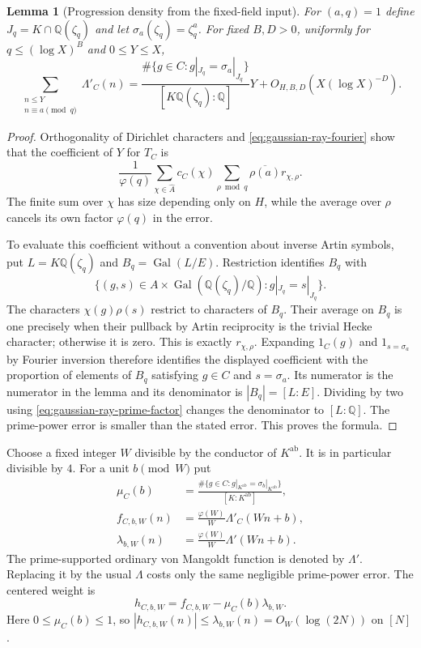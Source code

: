 \documentclass[11pt]{article}
\newtheorem{lemma}[theorem]{Lemma}
\theoremstyle{definition}
\theoremstyle{remark}
\newcommand{\Q}{\mathbb Q}
\begin{document}
\begin{lemma}[Progression density from the fixed-field input]
\label{lem:gaussian-ray-progression}
For $(a,q)=1$ define
$J_q=K\cap\Q(\zeta_q)$ and let $\sigma_a(\zeta_q)=\zeta_q^a$.
For fixed $B,D>0$, uniformly for $q\leq(\log X)^B$ and $0\leq Y\leq X$,
\[
 \sum_{\substack{n\leq Y\\ n\equiv a\pmod q}}\Lambda'_C(n)
 =\frac{\#\{g\in C:g|_{J_q}=\sigma_a|_{J_q}\}}
             {[K\Q(\zeta_q):\Q]}Y
       +O_{H,B,D}(X(\log X)^{-D}).
\]
\end{lemma}
\begin{proof}
Orthogonality of Dirichlet characters and
\eqref{eq:gaussian-ray-fourier} show that the coefficient of $Y$ for
$T_C$ is
\[
 \frac1{\varphi(q)}\sum_{\chi\in\widehat A}c_C(\chi)
       \sum_{\rho\bmod q}\overline{\rho(a)}r_{\chi,\rho}.
\]
The finite sum over $\chi$ has size depending only on $H$, while the
average over $\rho$ cancels its own factor $\varphi(q)$ in the error.

To evaluate this coefficient without a convention about inverse Artin
symbols, put $L=K\Q(\zeta_q)$ and $B_q=\operatorname{Gal}(L/E)$.
Restriction identifies $B_q$ with
\[
 \{(g,s)\in A\times\operatorname{Gal}(\Q(\zeta_q)/\Q):
                       g|_{J_q}=s|_{J_q}\}.
\]
The characters $\chi(g)\rho(s)$ restrict to characters of $B_q$.
Their average on $B_q$ is one precisely when their pullback by Artin
reciprocity is the trivial Hecke character; otherwise it is zero.
This is exactly $r_{\chi,\rho}$.  Expanding $1_C(g)$ and
$1_{s=\sigma_a}$ by Fourier inversion therefore identifies the displayed
coefficient with the proportion of elements of $B_q$ satisfying
$g\in C$ and $s=\sigma_a$.  Its numerator is the numerator in the
lemma and its denominator is $|B_q|=[L:E]$.
Dividing by two using \eqref{eq:gaussian-ray-prime-factor} changes the
denominator to $[L:\Q]$.  The prime-power error is smaller than the stated
error.  This proves the formula.
\end{proof}

Choose a fixed integer $W$ divisible by the conductor of $K^{\mathrm{ab}}$.
It is in particular divisible by $4$.
For a unit $b\pmod W$ put
\[
\begin{aligned}
 \mu_C(b)&=
 \frac{\#\{g\in C:g|_{K^{\mathrm{ab}}}=\sigma_b|_{K^{\mathrm{ab}}}\}}
      {[K:K^{\mathrm{ab}}]},\\
 f_{C,b,W}(n)&=\frac{\varphi(W)}W\Lambda'_C(Wn+b),\\
 \lambda_{b,W}(n)&=\frac{\varphi(W)}W\Lambda'(Wn+b).
\end{aligned}
\]
The prime-supported ordinary von Mangoldt function is denoted by
$\Lambda'$.  Replacing it by the usual $\Lambda$ costs only the same
negligible prime-power error.
The centered weight is
\begin{equation}\label{eq:gaussian-centered-weight}
       h_{C,b,W}=f_{C,b,W}-\mu_C(b)\lambda_{b,W}.
\end{equation}
Here $0\leq\mu_C(b)\leq1$, so
$|h_{C,b,W}(n)|\leq\lambda_{b,W}(n)=O_W(\log(2N))$ on $[N]$.
\end{document}
